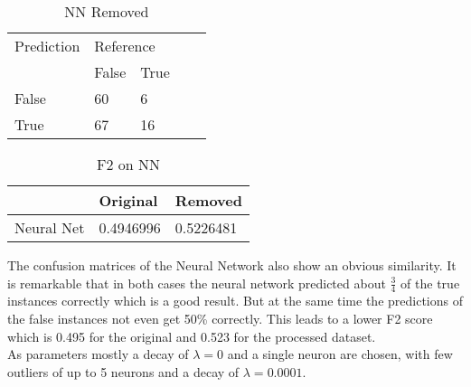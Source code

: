 \begin{table}[!htbp]
\centering
\caption{NN Removed}
\vspace{0.1cm}
\label{nn-remov}
\begin{tabular}{|l|ll|ll}
\cline{1-3}
Prediction & \multicolumn{2}{l|}{Reference} &  &  \\
           & False          & True          &  &  \\ \cline{2-3}
False      & 60              & 6             &  &  \\
True       & 67              & 16             &  &  \\ \cline{1-3}
\end{tabular}
\end{table}

\begin{table}[!htbp]
\centering
\caption{F2 on NN}
\vspace{0.1cm}
\label{nn-f2}
\begin{tabular}{|l|l|l|}
\hline
      & Original & Removed \\ \hline
Neural Net & 0.4946996 & 0.5226481       \\ \hline
\end{tabular}
\end{table}



The confusion matrices of the Neural Network also show an obvious similarity. It is remarkable that in both cases the neural network predicted about \(\frac{3}{4}\) of the true instances correctly which is a good result. But at the same time the predictions of the false instances not even get 50\% correctly. This leads to a lower F2 score which is 0.495 for the original and 0.523 for the processed dataset.\\
As parameters mostly a decay of \(\lambda = 0\) and a single neuron are chosen, with few outliers of up to 5 neurons and a decay of \(\lambda = 0.0001\).
